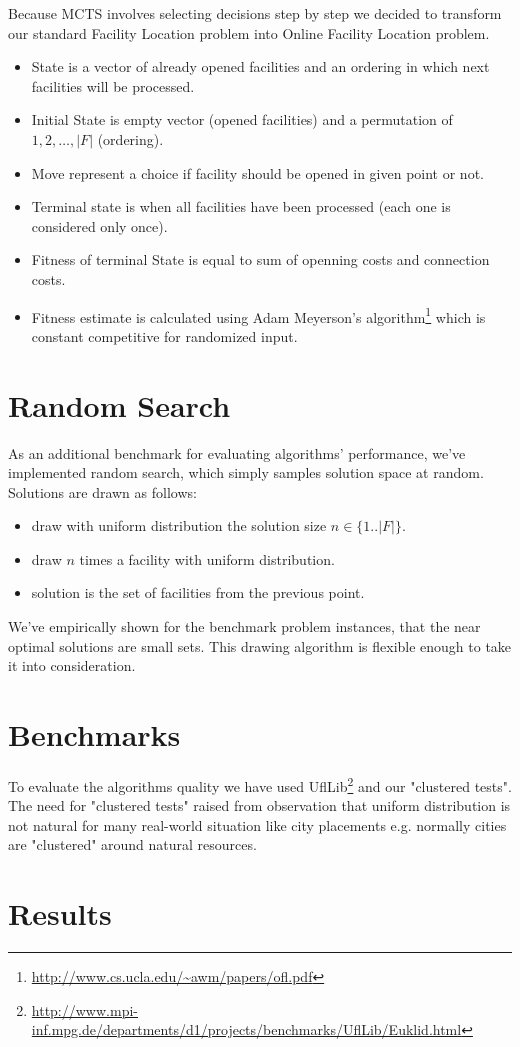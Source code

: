 Because MCTS involves selecting decisions step by step we decided to transform our
standard Facility Location problem into Online Facility Location problem.
\begin{itemize}
\item State is a vector of already opened facilities and an ordering in which
next facilities will be processed.
\item Initial State is empty vector (opened facilities) and a permutation
of $1,2,\dots, |F|$ (ordering).
\item Move represent a choice if facility should be opened in given point or not.
\item Terminal state is when all facilities have been processed (each one is
considered only once).
\item Fitness of terminal State is equal to sum of openning costs and connection costs.
\item Fitness estimate is calculated using Adam Meyerson's algorithm\footnote{\url{http://www.cs.ucla.edu/~awm/papers/ofl.pdf}}
which is constant competitive for randomized input.
\end{itemize}

\section{Random Search}

As an additional benchmark for evaluating algorithms' performance, we've implemented
random search, which simply samples solution space at random. Solutions are drawn as follows:
\begin{itemize}
\item draw with uniform distribution the solution size $n \in \{1..|F|\}$.
\item draw $n$ times a facility with uniform distribution.
\item solution is the set of facilities from the previous point.
\end{itemize}

We've empirically shown for the benchmark problem instances, that the near optimal
solutions are small sets. This drawing algorithm is flexible enough to take it
into consideration.

\section{Benchmarks}
To evaluate the algorithms quality we have used UflLib\footnote{\url{http://www.mpi-inf.mpg.de/departments/d1/projects/benchmarks/UflLib/Euklid.html}}
and our "clustered tests". The need for "clustered tests" raised from observation that
uniform distribution is not natural for many real-world situation like city placements
e.g. normally cities are "clustered" around natural resources.

\section{Results}

\begin{figure}[ht]
  
\end{figure}
